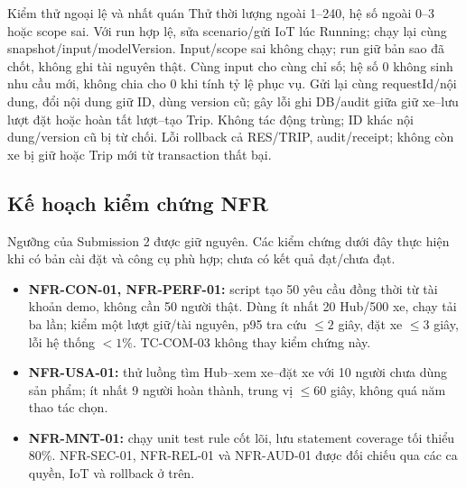 \begin{SystemTestCases}{Kiểm thử ngoại lệ và nhất quán}
{Thử thời lượng ngoài 1--240, hệ số ngoài 0--3 hoặc scope sai. Với run hợp lệ, sửa scenario/gửi IoT lúc Running; chạy lại cùng snapshot/input/modelVersion.}
{Input/scope sai không chạy; run giữ bản sao đã chốt, không ghi tài nguyên thật. Cùng input cho cùng chỉ số; hệ số 0 không sinh nhu cầu mới, không chia cho 0 khi tính tỷ lệ phục vụ.}
{Gửi lại cùng requestId/nội dung, đổi nội dung giữ ID, dùng version cũ; gây lỗi ghi DB/audit giữa giữ xe--lưu lượt đặt hoặc hoàn tất lượt--tạo Trip.}
{Không tác động trùng; ID khác nội dung/version cũ bị từ chối. Lỗi rollback cả RES/TRIP, audit/receipt; không còn xe bị giữ hoặc Trip mới từ transaction thất bại.}
\end{SystemTestCases}

\subsection{Kế hoạch kiểm chứng NFR}
Ngưỡng của Submission 2 được giữ nguyên. Các kiểm chứng dưới đây thực hiện khi có bản cài đặt và công cụ phù hợp; chưa có kết quả đạt/chưa đạt.
\begin{itemize}
\item \textbf{NFR-CON-01, NFR-PERF-01:} script tạo 50 yêu cầu đồng thời từ tài khoản demo, không cần 50 người thật. Dùng ít nhất 20 Hub/500 xe, chạy tải ba lần; kiểm một lượt giữ/tài nguyên, p95 tra cứu $\leq2$ giây, đặt xe $\leq3$ giây, lỗi hệ thống $<1\%$. TC-COM-03 không thay kiểm chứng này.
\item \textbf{NFR-USA-01:} thử luồng tìm Hub--xem xe--đặt xe với 10 người chưa dùng sản phẩm; ít nhất 9 người hoàn thành, trung vị $\leq60$ giây, không quá năm thao tác chọn.
\item \textbf{NFR-MNT-01:} chạy unit test rule cốt lõi, lưu statement coverage tối thiểu 80\%. NFR-SEC-01, NFR-REL-01 và NFR-AUD-01 được đối chiếu qua các ca quyền, IoT và rollback ở trên.
\end{itemize}
